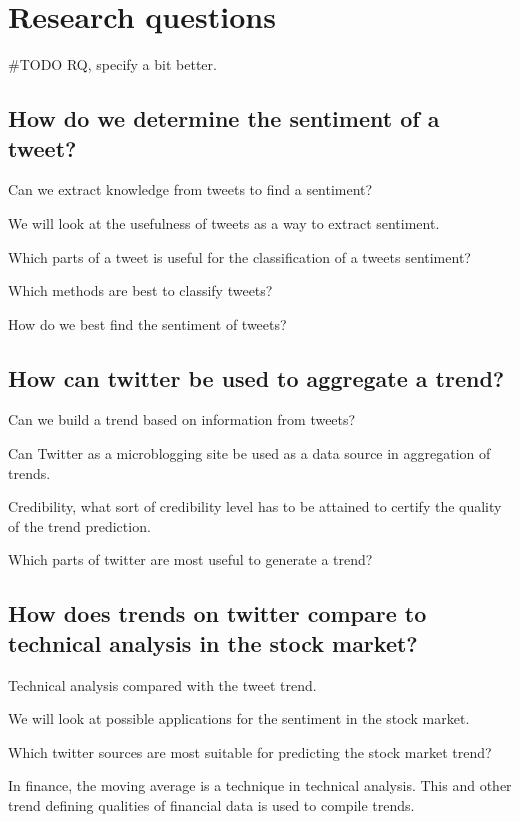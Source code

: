 \section{Research questions}\label{introduction:research_questions}
#TODO RQ, specify a bit better.\\ 

\subsection{How do we determine the sentiment of a
tweet?}\label{introduction:rq1}
Can we extract knowledge from tweets to find a sentiment?
	
We will look at the usefulness of tweets as a way to extract sentiment. 

Which parts of a tweet is useful for the classification of a tweets sentiment?

Which methods are best to classify tweets? 

How do we best find the sentiment of tweets?

\subsection{How can twitter be used to aggregate a
trend?}\label{introduction:rq2}
Can we build a trend based on information from tweets? 
 
Can Twitter as a microblogging site be used as a data source in aggregation of trends.

Credibility, what sort of credibility level has to be attained to certify the
quality of the trend prediction. 

Which parts of twitter are most useful to generate a trend?

\subsection{How does trends on twitter compare to technical analysis in the
stock market?}\label{introduction:rq3}
Technical analysis compared with the tweet trend.

We will look at possible applications for the sentiment in the stock market.

Which twitter sources are most suitable for predicting the stock market
trend?

In finance, the moving average is a technique in technical analysis. This and
other trend defining qualities of financial data is used to compile trends. 

